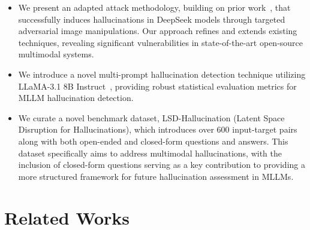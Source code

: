 \documentclass[runningheads]{llncs}
\begin{document}
\begin{itemize}

    \item We present an adapted attack methodology, building on prior work~\cite{salman2024intriguing}, that successfully induces hallucinations in DeepSeek models through targeted adversarial image manipulations. Our approach refines and extends existing techniques, revealing significant vulnerabilities in state-of-the-art open-source multimodal systems.
    
    \item We introduce a novel multi-prompt hallucination detection technique utilizing LLaMA-3.1 8B Instruct~\cite{dubey2024llama}, providing robust statistical evaluation metrics for MLLM hallucination detection. 
    
    \item We curate a novel benchmark dataset, LSD-Hallucination (Latent Space Disruption for
Hallucinations), which introduces over 600 input-target pairs along with both open-ended and closed-form questions and answers. This dataset specifically aims to address multimodal hallucinations, with the inclusion of closed-form questions serving as a key contribution to providing a more structured framework for future hallucination assessment in MLLMs.
\end{itemize}

\section{Related Works}
\end{document}
